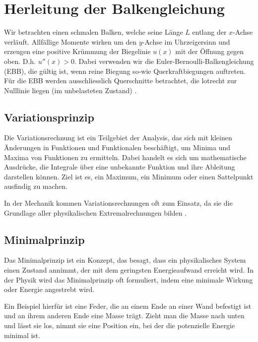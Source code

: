 %
%
%
%
\section{Herleitung der Balkengleichung
	\label{balken:section:teil2}}
%
Wir betrachten einen schmalen Balken, welche seine Länge $L$ entlang der $x$-Achse verläuft.
Allfällige Momente wirken um den $y$-Achse im Uhrzeigersinn und erzeugen eine positive Krümmung der Biegelinie $u(x)$ mit der Öffnung gegen oben.
D.h. $u''(x) > 0$.
Dabei verwenden wir die Euler-Bernoulli-Balkengleichung (EBB), die gültig ist, wenn reine Biegung so-wie Querkraftbiegungen auftreten.
Für die EBB werden ausschliesslich Querschnitte betrachtet, die lotrecht zur Nulllinie liegen (im unbelasteten Zustand) \cite{balken:Biegelinie}.

\subsection{Variationsprinzip}
Die Variationsrechnung ist ein Teilgebiet der Analysis, das sich mit kleinen Änderungen in Funktionen und Funktionalen beschäftigt, um Minima und Maxima von Funktionen zu ermitteln. Dabei handelt es sich um mathematische Ausdrücke, die Integrale über eine unbekannte Funktion und ihre Ableitung darstellen können. Ziel ist es, ein Maximum, ein Minimum oder einen Sattelpunkt ausfindig zu machen.

In der Mechanik kommen Variationsrechnungen oft zum Einsatz, da sie die Grundlage aller physikalischen Extremalrechnungen bilden \cite{balken:Variationsrechnung}.

\subsection{Minimalprinzip}
Das Minimalprinzip ist ein Konzept, das besagt, dass ein physikalisches System einen Zustand annimmt, der mit dem geringsten Energieaufwand erreicht wird. In der Physik wird das Minimalprinzip oft formuliert, indem eine minimale Wirkung oder Energie angestrebt wird.

Ein Beispiel hierfür ist eine Feder, die an einem Ende an einer Wand befestigt ist und an ihrem anderen Ende eine Masse trägt. Zieht man die Masse nach unten und lässt sie los, nimmt sie eine Position ein, bei der die potenzielle Energie minimal ist.

